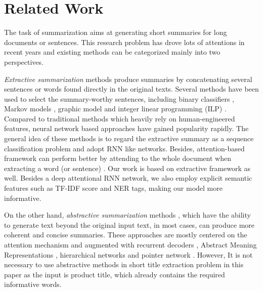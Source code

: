 \section{Related Work}

The task of summarization aims at generating short summaries for 
long documents or sentences. 
This research problem has drove lots of attentions in recent years and existing methods can be categorized mainly into two perspectives. 

\textit{Extractive summarization} methods \cite{erkan2004lexpagerank,mcdonald2007study,wong2008extractive} produce summaries by concatenating several sentences or words found directly in the original texts. 
Several methods have been used to select the summary-worthy sentences, 
including binary classifiers \cite{kupiec1995trainable}, Markov models \cite{conroy2001text}, graphic model \cite{erkan2004lexpagerank,mihalcea2005language} and integer linear programming (ILP) \cite{woodsend2010automatic}. 
Compared to traditional methods which heavily rely on human-engineered 
features, neural network based approaches \cite{kaageback2014extractive,cheng2016neural,nallapati2017summarunner,narayan2017neural} have gained 
popularity rapidly. The general idea of these methods is to regard the 
extractive summary as a sequence classification problem
and adopt RNN like networks. 
Besides, attention-based framework can perform better by attending to the whole document when extracting a word (or sentence) \cite{cheng2016neural}.
Our work is based on extractive framework as well. Besides a deep attentional RNN network, 
we also employ explicit semantic features such as TF-IDF score and NER tags, 
making our model more informative.

On the other hand, \textit{abstractive summarization} methods \cite{chen2016distraction,nallapati2016abstractive,see2017get}, 
which have the ability to generate text beyond the original input text, 
in most cases, can produce more coherent and concise summaries. 
These approaches are mostly centered on the attention mechanism and 
augmented with recurrent decoders \cite{chopra2016abstractive}, 
Abstract Meaning Representations \cite{takase2016neural}, 
hierarchical networks \cite{nallapati2016abstractive} 
and pointer network \cite{see2017get}. 
However, It is not necessary to use abstractive methods in 
short title extraction problem in this paper as the input is product title, 
which already contains the required informative words. 

